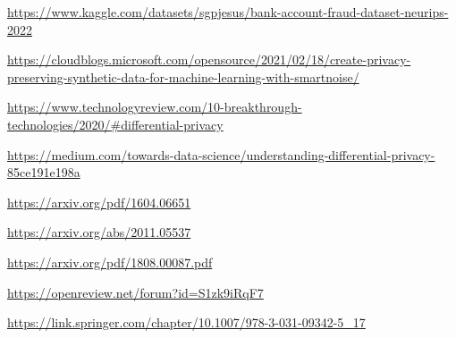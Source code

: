 \documentclass[10pt,twocolumn,letterpaper]{article}
\begin{document}
\begin{thebibliography}{9}
  \href{https://www.kaggle.com/datasets/sgpjesus/bank-account-fraud-dataset-neurips-2022}{https://www.kaggle.com/datasets/sgpjesus/bank-account-fraud-dataset-neurips-2022}

   
  \href{https://cloudblogs.microsoft.com/opensource/2021/02/18/create-privacy-preserving-synthetic-data-for-machine-learning-with-smartnoise/}{https://cloudblogs.microsoft.com/opensource/2021/02/18/create-privacy-preserving-synthetic-data-for-machine-learning-with-smartnoise/}

  \href{https://www.technologyreview.com/10-breakthrough-technologies/2020/#differential-privacy}{https://www.technologyreview.com/10-breakthrough-technologies/2020/#differential-privacy}

   
  \href{https://medium.com/towards-data-science/understanding-differential-privacy-85ce191e198a}{https://medium.com/towards-data-science/understanding-differential-privacy-85ce191e198a}

  \href{https://arxiv.org/pdf/1604.06651}{https://arxiv.org/pdf/1604.06651}

   
  \href{https://arxiv.org/abs/2011.05537}{https://arxiv.org/abs/2011.05537}

   
  \href{https://arxiv.org/pdf/1808.00087.pdf}{https://arxiv.org/pdf/1808.00087.pdf}

  \href{https://openreview.net/forum?id=S1zk9iRqF7}{https://openreview.net/forum?id=S1zk9iRqF7}

  \href{https://link.springer.com/chapter/10.1007/978-3-031-09342-5\_17}{https://link.springer.com/chapter/10.1007/978-3-031-09342-5\_17}

\end{thebibliography}
\end{document}
